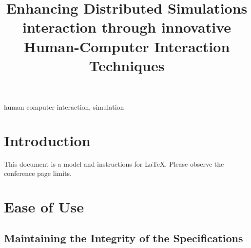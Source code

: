 \documentclass[conference]{IEEEtran}
\begin{document}
\usepackage{myacronyms}

\title{Enhancing Distributed Simulations interaction through innovative Human-Computer Interaction Techniques\\
}

\author{
}

\maketitle

\begin{abstract}
\end{abstract}

\begin{IEEEkeywords}
    human computer interaction, simulation
\end{IEEEkeywords}

\section{Introduction}
This document is a model and instructions for \LaTeX.
Please observe the conference page limits. 

\section{Ease of Use}

\subsection{Maintaining the Integrity of the Specifications}
\end{document}
